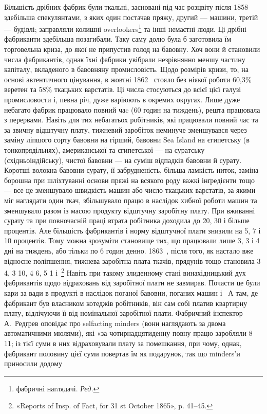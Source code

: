 \parcont{}  %
Більшість дрібних фабрик були ткальні, засновані під час розцвіту
після 1858~ здебільша спекулянтами, з яких один постачав
пряжу, другий — машини, третій — будівлі; заправляли колишні
overlookers\footnote*{
фабричні наглядачі. \emph{Ред.}
} та інші немаєтні люди. Ці дрібні фабриканти здебільша
позагибали. Таку саму долю була б заготовила їм торговельна
криза, до якої не припустив голод на бавовну. Хоч вони
й становили  числа фабрикантів, однак їхні фабрики увібрали
незрівнянно меншу частину капіталу, вкладеного в бавовняну промисловість.
Щодо розмірів кризи, то, на основі автентичного
цінування, в жовтні 1862~ стояло без ніякої роботи 60,3\%
веретен та 58\% ткацьких варстатів. Ці числа стосуються до всієї
цієї галузі промисловости і, певна річ, дуже варіюють в окремих
округах. Лише дуже небагато фабрик працювало повний чаc (60 годин на тиждень),
решта працювала з перервами. Навіть
для тих небагатьох робітників, які працювали повний час
та за звичну відштучну плату, тижневий заробіток неминуче зменшувався
через заміну ліпшого сорту бавовни на гірший, бавовни
Sea Island на єгипетську (в тонкопрядільнях), американської та
єгипетської — на суратську (східньоіндійську), чистої бавовни —
на суміш відпадків бавовни й сурату. Коротші волокна бавовни-сурату,
її забрудненість, більша ламкість ниток, заміна борошна
при шліхтуванні основи пряжі на всякого роду важкі інґредієнти
тощо — все це зменшувало швидкість машин або число ткацьких
варстатів, за якими міг наглядати один ткач, збільшувало працю
в наслідок хибної роботи машин та зменшувало разом із масою
продукту відштучну заробітну плату. При вживанні сурату та
при повночасній праці втрата робітника доходила до 20, 30 і
більше процентів. Але більшість фабрикантів і норму відштучної
плати знизили на 5, 7 і 10 процентів. Тому можна зрозуміти
становище тих, що працювали лише 3, 3 і 4 дні на тиждень,
або тільки по 6 годин денно. 1863~, після того, як настало вже
відносне поліпшення, тижнева заробітна плата ткачів, прядунів
тощо становила 3 4, 3 10, 4
6, 5 1 і~\footnote{
«Reports of Insp. of Fact, for 31 st October 1865», p. 41--45.
} Навіть при такому злиденному
стані винахідницький дух фабрикантів щодо відраховань
від заробітної плати не завмирав. Почасти це були кари за вади
в продукті в наслідок поганої бавовни, поганих машин і~
А там, де фабрикант був власником котеджів робітників, він сам
собі платив квартирну плату, відлічуючи її від номінальної
заробітної плати. Фабричний інспектор А.~Редґрев оповідає
про selfacting minders (вони наглядають за двома автоматичними
мюлями), які «за чотирнадцятиденну повну працю заробляли
8 11; із тієї суми в них відраховували плату за
помешкання, при чому, однак, фабрикант половину цієї суми
повертав їм як подарунок, так що minders’и приносили додому
\parbreak{}  %
